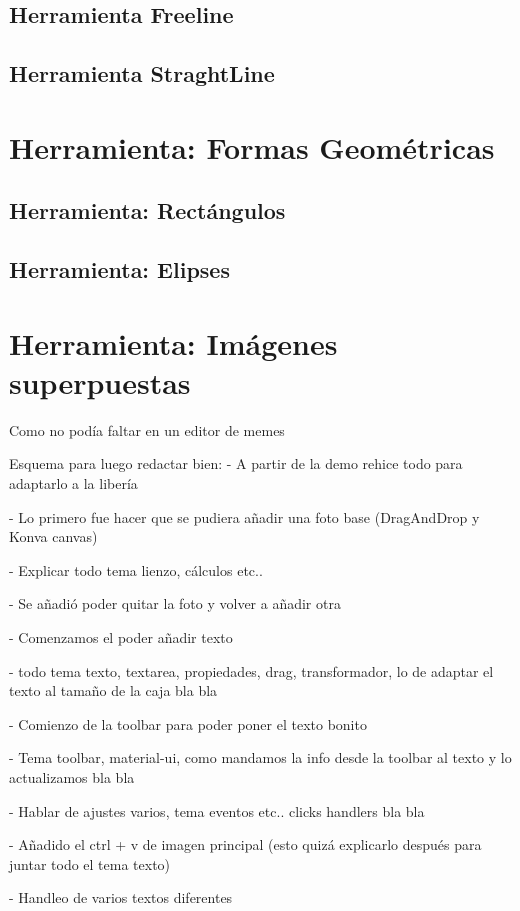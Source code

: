   \subsection{Herramienta Freeline}
  \subsection{Herramienta StraghtLine}
\section{Herramienta: Formas Geométricas}
  \subsection{Herramienta: Rectángulos}
  \subsection{Herramienta: Elipses}
\section{Herramienta: Imágenes superpuestas}
Como no podía faltar en un editor de memes


\iffalse
Esquema para luego redactar bien:
- A partir de la demo rehice todo para adaptarlo a la libería 

- Lo primero fue hacer que se pudiera añadir una foto base (DragAndDrop y Konva canvas)

- Explicar todo tema lienzo, cálculos etc..

- Se añadió poder quitar la foto y volver a añadir otra

- Comenzamos el poder añadir texto

- todo tema texto, textarea, propiedades, drag, transformador, lo de adaptar el texto al tamaño de la caja bla bla 

- Comienzo de la toolbar para poder poner el texto bonito

- Tema toolbar, material-ui, como mandamos la info desde la toolbar al texto y lo actualizamos bla bla

- Hablar de ajustes varios, tema eventos etc.. clicks handlers bla bla

- Añadido el ctrl + v de imagen principal (esto quizá explicarlo después para juntar todo el tema texto)

- Handleo de varios textos diferentes

